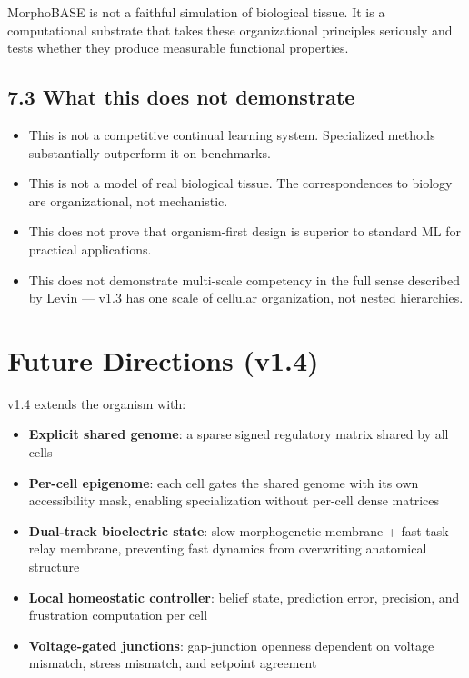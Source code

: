 \documentclass[11pt,a4paper]{article}
\begin{document}
MorphoBASE is not a faithful simulation of biological tissue. It is a computational substrate that takes these organizational principles seriously and tests whether they produce measurable functional properties.

\subsection{7.3 What this does not demonstrate}
\begin{itemize}[leftmargin=*,itemsep=3pt]
\item This is not a competitive continual learning system. Specialized methods substantially outperform it on benchmarks.
\item This is not a model of real biological tissue. The correspondences to biology are organizational, not mechanistic.
\item This does not prove that organism-first design is superior to standard ML for practical applications.
\item This does not demonstrate multi-scale competency in the full sense described by Levin --- v1.3 has one scale of cellular organization, not nested hierarchies.
\end{itemize}

\section{Future Directions (v1.4)}
v1.4 extends the organism with:
\begin{itemize}[leftmargin=*,itemsep=3pt]
\item \textbf{Explicit shared genome}: a sparse signed regulatory matrix shared by all cells
\item \textbf{Per-cell epigenome}: each cell gates the shared genome with its own accessibility mask, enabling specialization without per-cell dense matrices
\item \textbf{Dual-track bioelectric state}: slow morphogenetic membrane + fast task-relay membrane, preventing fast dynamics from overwriting anatomical structure
\item \textbf{Local homeostatic controller}: belief state, prediction error, precision, and frustration computation per cell
\item \textbf{Voltage-gated junctions}: gap-junction openness dependent on voltage mismatch, stress mismatch, and setpoint agreement
\end{itemize}
\end{document}
